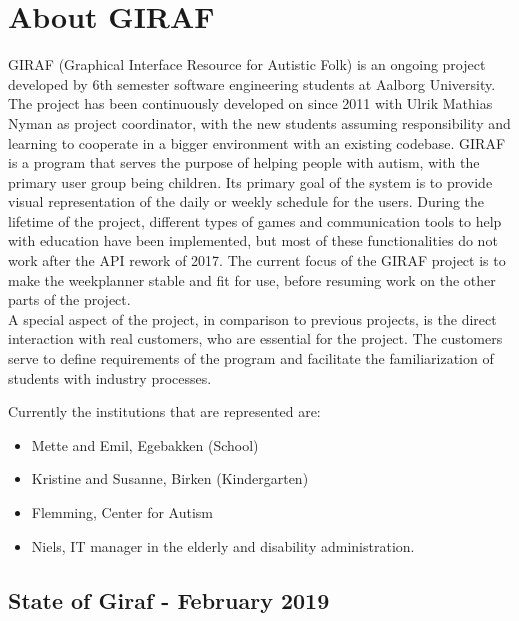 \section{About GIRAF}
GIRAF (Graphical Interface Resource for Autistic Folk) is an ongoing project developed by 6th semester software engineering students at Aalborg University. 
The project has been continuously developed on since 2011 with Ulrik Mathias Nyman as project coordinator, with the new students assuming responsibility and learning to cooperate in a bigger environment with an existing codebase. 
GIRAF is a program that serves the purpose of helping people with autism, with the primary user group being children.
Its primary goal of the system is to provide visual representation of the daily or weekly schedule for the users.
During the lifetime of the project, different types of games and communication tools to help with education have been implemented, but most of these functionalities do not work after the API rework of 2017. The current focus of the GIRAF project is to make the weekplanner stable and fit for use, before resuming work on the other parts of the project. 
\\
A special aspect of the project, in comparison to previous projects, is the direct interaction with real customers, who are essential for the project.
The customers serve to define requirements of the program and facilitate the familiarization of students with industry processes.

Currently the institutions that are represented are: 
\begin{itemize}
    \item Mette and Emil, Egebakken (School)
    \item Kristine and Susanne, Birken (Kindergarten)
    \item Flemming, Center for Autism
    \item Niels, IT manager in the elderly and disability administration.
\end{itemize}

\subsection{State of Giraf - February 2019}
